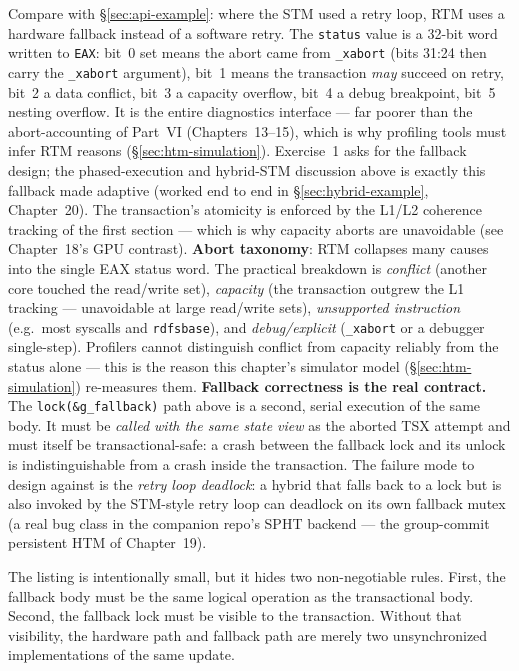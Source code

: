 Compare with \S\ref{sec:api-example}: where the STM used a retry loop, RTM uses a hardware fallback instead of a software retry. The \texttt{status} value is a 32-bit word written to \texttt{EAX}: bit~0 set means the abort came from \texttt{\_xabort} (bits 31:24 then carry the \texttt{\_xabort} argument), bit~1 means the transaction \emph{may} succeed on retry, bit~2 a data conflict, bit~3 a capacity overflow, bit~4 a debug breakpoint, bit~5 nesting overflow. It is the entire diagnostics interface --- far poorer than the abort-accounting of Part~VI (Chapters~13--15), which is why profiling tools must infer RTM reasons (\S\ref{sec:htm-simulation}). Exercise~1 asks for the fallback design; the phased-execution and hybrid-STM discussion above is exactly this fallback made adaptive (worked end to end in \S\ref{sec:hybrid-example}, Chapter~20). The transaction's atomicity is enforced by the L1/L2 coherence tracking of the first section --- which is why capacity aborts are unavoidable (see Chapter~18's GPU contrast). \textbf{Abort taxonomy}: RTM collapses many causes into the single EAX status word. The practical breakdown is \emph{conflict} (another core touched the read/write set), \emph{capacity} (the transaction outgrew the L1 tracking --- unavoidable at large read/write sets), \emph{unsupported instruction} (e.g.\ most syscalls and \texttt{rdfsbase}), and \emph{debug/explicit} (\texttt{\_xabort} or a debugger single-step). Profilers cannot distinguish conflict from capacity reliably from the status alone --- this is the reason this chapter's simulator model (\S\ref{sec:htm-simulation}) re-measures them. \textbf{Fallback correctness is the real contract.} The \texttt{lock(\&g\_fallback)} path above is a second, serial execution of the same body. It must be \emph{called with the same state view} as the aborted TSX attempt and must itself be transactional-safe: a crash between the fallback lock and its unlock is indistinguishable from a crash inside the transaction. The failure mode to design against is the \emph{retry loop deadlock}: a hybrid that falls back to a lock but is also invoked by the STM-style retry loop can deadlock on its own fallback mutex (a real bug class in the companion repo's SPHT backend --- the group-commit persistent HTM of Chapter~19).

The listing is intentionally small, but it hides two non-negotiable rules. First, the fallback body must be the same logical operation as the transactional body. Second, the fallback lock must be visible to the transaction. Without that visibility, the hardware path and fallback path are merely two unsynchronized implementations of the same update.

